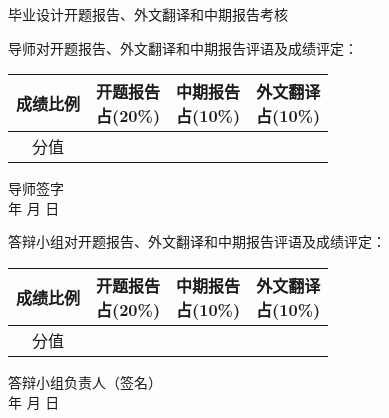 \thispagestyle{empty}
\begin{center}
\stfangsong\sanhao 毕业设计开题报告、外文翻译和中期报告考核
\end{center}
\songti\sihao 导师对开题报告、外文翻译和中期报告评语及成绩评定：
\vspace{4cm}

{
\hspace{3cm} \songti\xiaosi
\begin{tabular}{|c|c|c|c|}
    \hline
    成绩比例 & \parbox[t]{4em}{开题报告\\[-3.5em]占(20\%)} &
               \parbox[t]{4em}{中期报告\\[-3.5em]占(10\%)} &
               \parbox[t]{4em}{外文翻译\\[-3.5em]占(10\%)} \\

    \hline
    分值   & & &  \\
    \hline
\end{tabular}
}
\begin{flushright}
    导师签字\;\underline{\hspace{4em}}\\
    年 \quad 月 \quad 日
\end{flushright}
\vspace{-1cm}
{\songti\sihao 答辩小组对开题报告、外文翻译和中期报告评语及成绩评定：}
\vspace{4cm}

{
\hspace{3cm} \songti\xiaosi
\begin{tabular}{|c|c|c|c|}
    \hline
    成绩比例 & \parbox[t]{4em}{开题报告\\[-3.5em]占(20\%)} &
               \parbox[t]{4em}{中期报告\\[-3.5em]占(10\%)} &
               \parbox[t]{4em}{外文翻译\\[-3.5em]占(10\%)} \\

    \hline
    分值   & & &  \\
    \hline
\end{tabular}
}
\begin{flushright}
    答辩小组负责人（签名）\;\underline{\hspace{4em}}\\
    年 \quad 月 \quad 日
\end{flushright}



